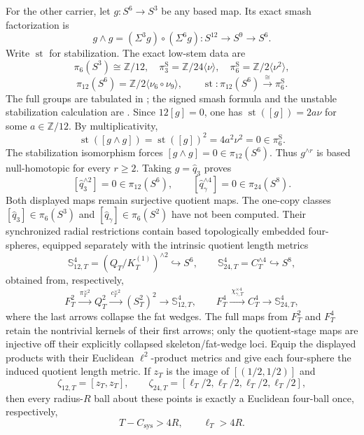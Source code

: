 \begin{enumerate}[leftmargin=1.8em]
For the other carrier, let \(g:S^6\to S^3\) be any based map.  Its exact
smash factorization is
\[
 g\wedge g=(\Sigma^3g)\circ(\Sigma^6g):
 S^{12}\longrightarrow S^9\longrightarrow S^6.
\]
Write \(\operatorname{st}\) for stabilization.  The exact low-stem data are
\[
 \pi_6(S^3)\cong\mathbb Z/12,
 \quad
 \pi_3^{\mathrm S}=\mathbb Z/24\langle\nu\rangle,
 \quad
 \pi_6^{\mathrm S}=\mathbb Z/2\langle\nu^2\rangle,
\]
\[
 \pi_{12}(S^6)=\mathbb Z/2\langle\nu_6\circ\nu_9\rangle,
 \qquad
 \operatorname{st}:\pi_{12}(S^6)
 \xrightarrow{\ \cong\ }\pi_6^{\mathrm S}.
\]
The full groups are tabulated in \cite[p.~339]{Hatcher2002}; the signed smash
formula and the unstable stabilization calculation are
\cite[Propositions~3.1 and~5.11]{Toda1962}.
Since \(12[g]=0\), one has
\(\operatorname{st}([g])=2a\nu\) for some \(a\in\mathbb Z/12\).  By
multiplicativity,
\[
 \operatorname{st}([g\wedge g])
 =\operatorname{st}([g])^2
 =4a^2\nu^2=0\in\pi_6^{\mathrm S}.
\]
The stabilization isomorphism forces
\([g\wedge g]=0\in\pi_{12}(S^6)\).
Thus \(g^{\wedge r}\) is based null-homotopic for every \(r\ge2\).  Taking
\(g=\widehat q_3\) proves
\[
 [\widehat q_3^{\wedge2}]=0\in\pi_{12}(S^6),
 \qquad
 [\widehat q_\gamma^{\wedge4}]=0\in\pi_{24}(S^8).
\]
Both displayed maps remain surjective quotient maps.  The one-copy classes
\([\widehat q_3]\in\pi_6(S^3)\) and
\([\widehat q_\gamma]\in\pi_6(S^2)\) have not been computed.
Their synchronized radial restrictions contain based topologically embedded
four-spheres, equipped separately with the intrinsic quotient length metrics
\[
 \mathbb S_{12,T}^4
   =(Q_T/K_T^{(1)})^{\wedge2}\hookrightarrow S^6,\qquad
 \mathbb S_{24,T}^4=C_T^{\wedge4}\hookrightarrow S^8,
\]
obtained from, respectively,
\[
 F_T^2\xrightarrow{\ \pi_T^{\times2}\ }Q_T^2
 \xrightarrow{\ c_T^{\times2}\ }(S_T^2)^2
 \longrightarrow\mathbb S_{12,T}^4,\qquad
 F_T^4\xrightarrow{\ \chi_{\gamma,T}^{\times4}\ }C_T^4
 \longrightarrow\mathbb S_{24,T}^4,
\]
where the last arrows collapse the fat wedges.  The full maps from
\(F_T^2\) and \(F_T^4\) retain the nontrivial kernels of their first arrows;
only the quotient-stage maps are injective off their explicitly collapsed
skeleton/fat-wedge loci.  Equip the displayed products
with their Euclidean \(\ell^2\)-product metrics and give each four-sphere the
induced quotient length metric.  If
\(z_T\) is the image of \([(1/2,1/2)]\) and
\[
 \zeta_{12,T}=[z_T,z_T],\qquad
 \zeta_{24,T}=
 [\ell_T/2,\ell_T/2,\ell_T/2,\ell_T/2],
\]
then every radius-\(R\) ball about these points is exactly a Euclidean
four-ball once, respectively,
\[
 T-C_{\mathrm{sys}}>4R,\qquad \ell_T>4R.
\]
\end{enumerate}

